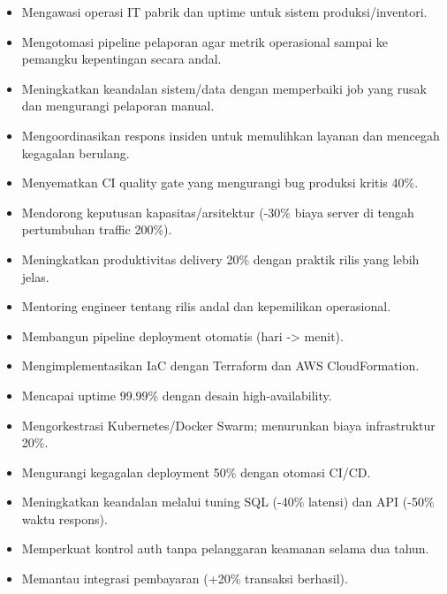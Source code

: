 \begin{itemize}
  \item Mengawasi operasi IT pabrik dan uptime untuk sistem produksi/inventori.
  \item Mengotomasi pipeline pelaporan agar metrik operasional sampai ke pemangku kepentingan secara andal.
  \item Meningkatkan keandalan sistem/data dengan memperbaiki job yang rusak dan mengurangi pelaporan manual.
  \item Mengoordinasikan respons insiden untuk memulihkan layanan dan mencegah kegagalan berulang.
\end{itemize}
\vspace{4pt}
\begin{itemize}
  \item Menyematkan CI quality gate yang mengurangi bug produksi kritis 40\%.
  \item Mendorong keputusan kapasitas/arsitektur (-30\% biaya server di tengah pertumbuhan traffic 200\%).
  \item Meningkatkan produktivitas delivery 20\% dengan praktik rilis yang lebih jelas.
  \item Mentoring engineer tentang rilis andal dan kepemilikan operasional.
\end{itemize}
\vspace{4pt}
\begin{itemize}
  \item Membangun pipeline deployment otomatis (hari -> menit).
  \item Mengimplementasikan IaC dengan Terraform dan AWS CloudFormation.
  \item Mencapai uptime 99.99\% dengan desain high-availability.
  \item Mengorkestrasi Kubernetes/Docker Swarm; menurunkan biaya infrastruktur 20\%.
  \item Mengurangi kegagalan deployment 50\% dengan otomasi CI/CD.
\end{itemize}
\vspace{4pt}
\begin{itemize}
  \item Meningkatkan keandalan melalui tuning SQL (-40\% latensi) dan API (-50\% waktu respons).
  \item Memperkuat kontrol auth tanpa pelanggaran keamanan selama dua tahun.
  \item Memantau integrasi pembayaran (+20\% transaksi berhasil).
\end{itemize}
